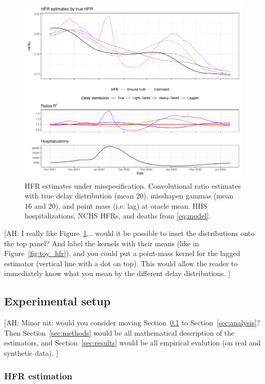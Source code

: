 \documentclass{article}
\newcommand{\ahcomment}[1]{{\color{red}[AH: #1]}}
\begin{document}
\begin{figure}
    \centering
    \includegraphics[width=.8\linewidth]{Figs/Simulated/toy_misp.pdf}
    \caption{HFR estimates under misspecification. Convolutional ratio estimates with true delay distribution (mean 20), misshapen gammas (mean 16 and 20), and point mass (i.e. lag) at oracle mean. HHS hospitalizations, NCHS HFRs, and deaths from \eqref{eq:model}.}
    \label{fig:misspecified}
\end{figure}

\ahcomment{
  I really like Figure~\ref{fig:misspecified}... would it be possible to inset
  the distributions onto the top panel?  And label the kernels with their
  means (like in Figure~\ref{fig:toy_hfr}), and you could put a point-mass
  kernel for the lagged estimator (vertical line with a dot on top).  This
  would allow the reader to immediately know what you mean by the different
  delay distributions.
}



\subsection{Experimental setup}\label{sec:setup}
\ahcomment{
  Minor nit: would you consider moving Section~\ref{sec:setup} to
  Section~\ref{sec:analysis}?  Then Section~\ref{sec:methods} would be all
  mathematical description of the estimators, and Section~\ref{sec:results}
  would be all empirical evalution (on real and synthetic data).
}
\subsubsection{HFR estimation}
\end{document}
